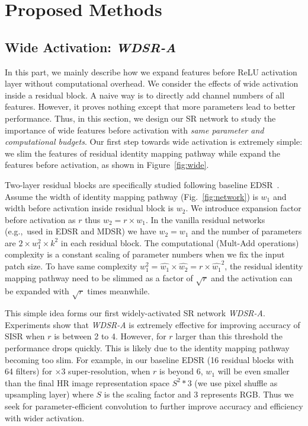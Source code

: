 \documentclass{article}
\begin{document}
\section{Proposed Methods}
\subsection{Wide Activation: \textit{WDSR-A}}
In this part, we mainly describe how we expand features before ReLU activation layer without computational overhead. We consider the effects of wide activation inside a residual block. A naive way is to directly add channel numbers of all features. However, it proves nothing except that more parameters lead to better performance. Thus, in this section, we design our SR network to study the importance of wide features before activation with \textit{same parameter and computational budgets}. Our first step towards wide activation is extremely simple: we slim the features of residual identity mapping pathway while expand the features before activation, as shown in Figure~\ref{fig:wide}.

Two-layer residual blocks are specifically studied following baseline EDSR~\cite{lim2017enhanced}. Assume the width of identity mapping pathway (Fig.~\ref{fig:network}) is \(w_1\) and width before activation inside residual block is \(w_2\). We introduce expansion factor before activation as \(r\) thus \(w_2 = r \times w_1\). In the vanilla residual networks (e.g.,\ used in EDSR and MDSR) we have \(w_2 = w_1\) and the number of parameters are \(2 \times w_1^2 \times k^2\) in each residual block. The computational (Mult-Add operations) complexity is a constant scaling of parameter numbers when we fix the input patch size. To have same complexity \(w_1^2 = \hat{w_1} \times \hat{w_2} = r \times \hat{w_1}^2\), the residual identity mapping pathway need to be slimmed as a factor of \(\sqrt{r}\) and the activation can be expanded with \(\sqrt{r}\) times meanwhile.

This simple idea forms our first widely-activated SR network \textit{WDSR-A}. Experiments show that \textit{WDSR-A} is extremely effective for improving accuracy of SISR when \(r\) is between 2 to 4. However, for \(r\) larger than this threshold the performance drops quickly. This is likely due to the identity mapping pathway becoming too slim. For example, in our baseline EDSR (16 residual blocks with 64 filters) for \(\times 3\) super-resolution, when \(r\) is beyond 6, \(w_1\) will be even smaller than the final HR image representation space \(S^2*3\) (we use pixel shuffle as upsampling layer) where \(S\) is the scaling factor and 3 represents RGB. Thus we seek for parameter-efficient convolution to further improve accuracy and efficiency with wider activation.
\end{document}
